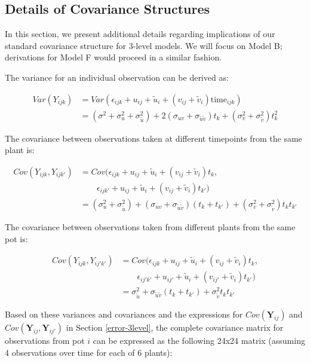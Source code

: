 \documentclass[
]{krantz}
\begin{document}
\hypertarget{optionalerror}{%
\subsection{Details of Covariance Structures}\label{optionalerror}}

In this section, we present additional details regarding implications of our standard covariance structure for 3-level models. We will focus on Model B; derivations for Model F would proceed in a similar fashion.

The variance for an individual observation can be derived as:

\begin{align*}
Var(Y_{ijk}) & = Var(\epsilon_{ijk}+u_{ij}+\tilde{u}_{i}+(v_{ij}+\tilde{v}_{i})\textrm{time}_{ijk}) \\
 & = (\sigma^{2} + \sigma_{u}^{2} + \sigma_{\tilde{u}}^{2}) + 2(\sigma_{uv} + \sigma_{\tilde{u}\tilde{v}})t_k + (\sigma_{v}^{2} + \sigma_{\tilde{v}}^{2})t_{k}^{2}
\end{align*}

The covariance between observations taken at different timepoints from the same plant is:

\begin{align*}
Cov(Y_{ijk},Y_{ijk'}) & = Cov(\epsilon_{ijk}+u_{ij}+\tilde{u}_{i}+(v_{ij}+\tilde{v}_{i})t_{k}, \\
 & \qquad \epsilon_{ijk'}+u_{ij}+\tilde{u}_{i}+(v_{ij}+\tilde{v}_{i})t_{k'}) \\
 & = (\sigma_{u}^{2} + \sigma_{\tilde{u}}^{2}) + (\sigma_{uv} + \sigma_{\tilde{u}\tilde{v}})(t_{k}+t_{k'}) + (\sigma_{v}^{2} + \sigma_{\tilde{v}}^{2})t_{k}t_{k'}
\end{align*}

The covariance between observations taken from different plants from the same pot is:

\begin{align*}
Cov(Y_{ijk},Y_{ij'k'}) & = Cov(\epsilon_{ijk}+u_{ij}+\tilde{u}_{i}+(v_{ij}+\tilde{v}_{i})t_{k}, \\
 & \qquad \epsilon_{ij'k'}+u_{ij'}+\tilde{u}_{i}+(v_{ij'}+\tilde{v}_{i})t_{k'}) \\
 & = \sigma_{\tilde{u}}^{2} + \sigma_{\tilde{u}\tilde{v}}(t_{k}+t_{k'}) + \sigma_{\tilde{v}}^{2}t_{k}t_{k'}
\end{align*}

Based on these variances and covariances and the expressions for \(Cov(\textbf{Y}_{ij})\) and \(Cov(\textbf{Y}_{ij},\textbf{Y}_{ij'})\) in Section \ref{error-3level}, the complete covariance matrix for observations from pot \(i\) can be expressed as the following 24x24 matrix (assuming 4 observations over time for each of 6 plants):
\end{document}
